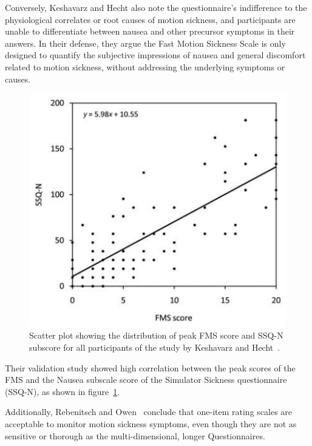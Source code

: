 Conversely, Keshavarz and Hecht also note the questionnaire's indifference to the physiological correlates or root
causes of motion sickness, and participants are unable to differentiate between nausea and other precursor symptoms
in their answers.
In their defense, they argue the Fast Motion Sickness Scale is only designed to quantify the subjective impressions
of nausea and general discomfort related to motion sickness, without addressing the underlying symptoms or causes.

\begin{figure}[h]
    \centering
    \includegraphics[width=\textwidth/2]{content/2_2_cybersickness/img/FMStoSSQcorrelation[Keshavarz2011]}
    \caption{Scatter plot showing the distribution of peak FMS score and SSQ-N subscore for all participants of the
    study by Keshavarz and Hecht~\cite{Keshavarz2011}.}
    \label{fig:fms-ssq-correlation}
\end{figure}

Their validation study showed high correlation between the peak scores of the FMS and the Nausea subscale score of
the Simulator Sickness questionnaire (SSQ-N), as shown in figure~\ref{fig:fms-ssq-correlation}.

Additionally, Rebenitsch and Owen~\cite{Rebenitsch2016} conclude that one-item rating scales are acceptable to
monitor motion sickness symptoms, even though they are not as sensitive or thorough as the multi-dimensional, longer
Questionnaires.

